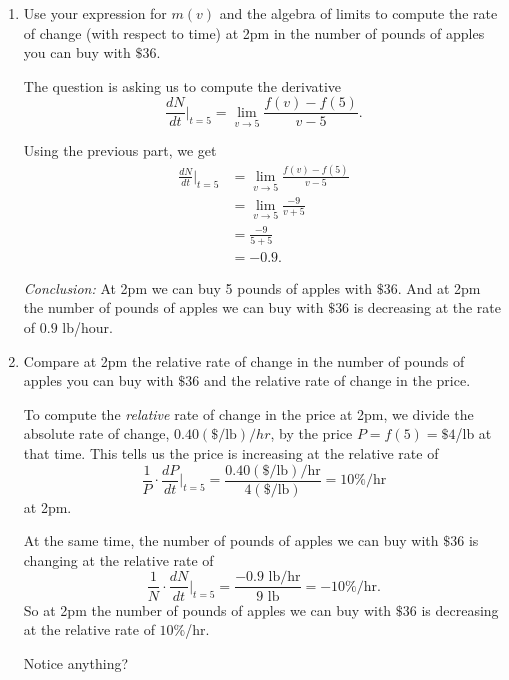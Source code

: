 \documentclass{ximera}
\begin{document}
\begin{question}
\begin{enumerate}
\begin{enumerate}
\begin{explanation}
\end{explanation}

\item Use your expression for $m(v)$ and the algebra of limits to compute the rate of change (with respect to time) at 2pm in the number of pounds of apples you can buy with $\$36$. %

\begin{explanation}
The question is asking us to compute the derivative
\[
  \frac{dN}{dt}\Big|_{t=5} = \lim_{v\to 5} \frac{f(v)-f(5)}{v-5} .
\]

Using the previous part, we get
\begin{align*}
\frac{dN}{dt}\Big|_{t=5} &= \lim_{v\to 5} \frac{f(v)-f(5)}{v-5} \\
                                    &= \lim_{v\to 5} \frac{-9}{v+5} \\
                                    &= \frac{-9}{5+5} \\
                                   &= -0.9 .
\end{align*}

\emph{Conclusion:} At 2pm we can buy 5 pounds of apples with $\$36$. And at 2pm the number of pounds of apples we can buy with $\$36$ is decreasing at the rate of $0.9$ lb/hour.
\end{explanation}

\item Compare at 2pm the relative rate of change in the number of pounds of apples you can buy with $\$36$ and the relative rate of change in the price. %

\begin{explanation}
To compute the \emph{relative} rate of change in the price at 2pm, we divide the absolute rate of change, $0.40(\$/\text{lb})/hr$, by the price $P=f(5) = \$4$/lb at that time. This tells us the price is increasing at the relative rate of 
\[
   \frac{1}{P} \cdot \frac{dP}{dt} \Big|_{t=5} = \frac{0.40(\$/\text{lb})/\text{hr}}{4(\$/\text{lb})} = 10\%/\text{hr}
\]
at 2pm.

At the same time, the number of pounds of apples we can buy with $\$36$ is changing at the relative rate of 
\[
  \frac{1}{N} \cdot \frac{dN}{dt} \Big|_{t=5} = \frac{-0.9 \text{ lb/hr}}{9\text{ lb}} = -10\%/\text{hr} .
\]
So at 2pm the number of pounds of apples we can buy with $\$36$ is decreasing at the relative rate of $10\%$/hr.
\end{explanation}

\begin{freeResponse}
Notice anything?
\end{freeResponse}


\end{enumerate}

\end{enumerate}
\end{question}
\end{document}
